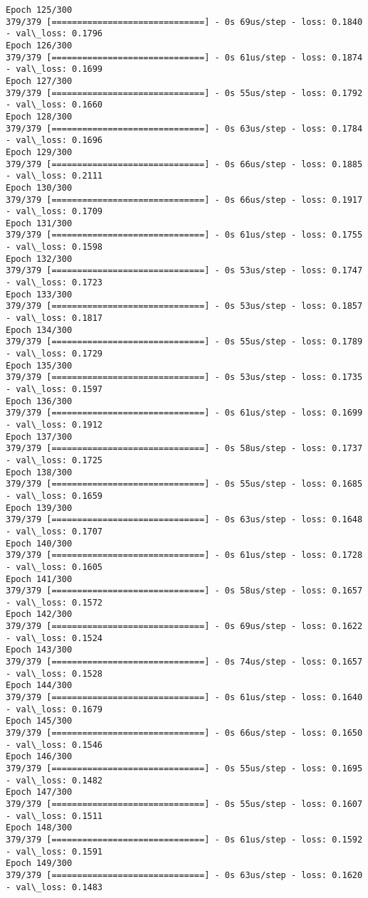\documentclass[11pt]{article}
\begin{document}
\begin{Verbatim}[commandchars=\\\{\}]
Epoch 125/300
379/379 [==============================] - 0s 69us/step - loss: 0.1840 - val\_loss: 0.1796
Epoch 126/300
379/379 [==============================] - 0s 61us/step - loss: 0.1874 - val\_loss: 0.1699
Epoch 127/300
379/379 [==============================] - 0s 55us/step - loss: 0.1792 - val\_loss: 0.1660
Epoch 128/300
379/379 [==============================] - 0s 63us/step - loss: 0.1784 - val\_loss: 0.1696
Epoch 129/300
379/379 [==============================] - 0s 66us/step - loss: 0.1885 - val\_loss: 0.2111
Epoch 130/300
379/379 [==============================] - 0s 66us/step - loss: 0.1917 - val\_loss: 0.1709
Epoch 131/300
379/379 [==============================] - 0s 61us/step - loss: 0.1755 - val\_loss: 0.1598
Epoch 132/300
379/379 [==============================] - 0s 53us/step - loss: 0.1747 - val\_loss: 0.1723
Epoch 133/300
379/379 [==============================] - 0s 53us/step - loss: 0.1857 - val\_loss: 0.1817
Epoch 134/300
379/379 [==============================] - 0s 55us/step - loss: 0.1789 - val\_loss: 0.1729
Epoch 135/300
379/379 [==============================] - 0s 53us/step - loss: 0.1735 - val\_loss: 0.1597
Epoch 136/300
379/379 [==============================] - 0s 61us/step - loss: 0.1699 - val\_loss: 0.1912
Epoch 137/300
379/379 [==============================] - 0s 58us/step - loss: 0.1737 - val\_loss: 0.1725
Epoch 138/300
379/379 [==============================] - 0s 55us/step - loss: 0.1685 - val\_loss: 0.1659
Epoch 139/300
379/379 [==============================] - 0s 63us/step - loss: 0.1648 - val\_loss: 0.1707
Epoch 140/300
379/379 [==============================] - 0s 61us/step - loss: 0.1728 - val\_loss: 0.1605
Epoch 141/300
379/379 [==============================] - 0s 58us/step - loss: 0.1657 - val\_loss: 0.1572
Epoch 142/300
379/379 [==============================] - 0s 69us/step - loss: 0.1622 - val\_loss: 0.1524
Epoch 143/300
379/379 [==============================] - 0s 74us/step - loss: 0.1657 - val\_loss: 0.1528
Epoch 144/300
379/379 [==============================] - 0s 61us/step - loss: 0.1640 - val\_loss: 0.1679
Epoch 145/300
379/379 [==============================] - 0s 66us/step - loss: 0.1650 - val\_loss: 0.1546
Epoch 146/300
379/379 [==============================] - 0s 55us/step - loss: 0.1695 - val\_loss: 0.1482
Epoch 147/300
379/379 [==============================] - 0s 55us/step - loss: 0.1607 - val\_loss: 0.1511
Epoch 148/300
379/379 [==============================] - 0s 61us/step - loss: 0.1592 - val\_loss: 0.1591
Epoch 149/300
379/379 [==============================] - 0s 63us/step - loss: 0.1620 - val\_loss: 0.1483

\end{Verbatim}
\end{document}

